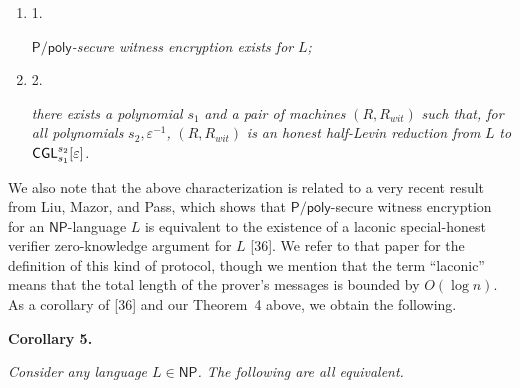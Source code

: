 \documentclass[10pt,a4paper]{article}
\begin{document}
\begin{enumerate}


\item[] 
1. 


${\mathsf{P}}/{\mathsf{poly}}$\emph{-secure witness encryption exists for }$L$\emph{;}\par





\item[] 
2. 


\emph{there exists a polynomial }$s_{1}$\emph{ and a pair of machines }$(R,R_{wit})$\emph{ such that, for all polynomials }$s_{2},\varepsilon^{-1}$\emph{, }$(R,R_{wit})$\emph{ is an honest half-Levin reduction from }$L$\emph{ to }${\sf CGL}^{s_{2}}_{s_{1}}[\varepsilon]$\emph{.}\par





\end{enumerate}






We also note that the above characterization is related to a very recent result from Liu, Mazor, and Pass, which shows that ${\mathsf{P}}/{\mathsf{poly}}$-secure witness encryption for an ${\mathsf{NP}}$-language $L$ is equivalent to the existence of a laconic special-honest verifier zero-knowledge argument for $L$ [36]. We refer to that paper for the definition of this kind of protocol, though we mention that the term “laconic” means that the total length of the prover’s messages is bounded by $O(\log n)$. As a corollary of [36] and our Theorem 4 above, we obtain the following.\par





\par\medskip\noindent\textbf{
\textbf{Corollary 5}\textbf{.}
}\par



\emph{Consider any language $L\in{\mathsf{NP}}$. The following are all equivalent.}\par
\end{document}
